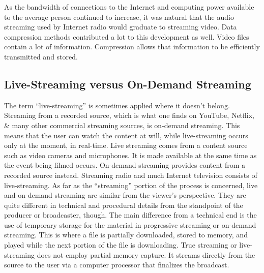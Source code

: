 \documentclass{article}
\begin{document}

As the bandwidth of connections to the Internet and computing power available to the average person continued to increase, it was natural that the audio streaming used by Internet radio would graduate to streaming video. Data compression methods contributed a lot to this development as well. Video files contain a lot of information. Compression allows that information to be efficiently transmitted and stored.

\subsection{Live-Streaming versus On-Demand Streaming}
The term “live-streaming” is sometimes applied where it doesn’t belong. Streaming from a recorded source, which is what one finds on YouTube, Netflix, \& many other commercial streaming sources, is on-demand streaming. This means that the user can watch the content at will, while live-streaming occurs only at the moment, in real-time. Live streaming comes from a content source such as video cameras and microphones. It is made available at the same time as the event being filmed occurs. On-demand streaming provides content from a recorded source instead. Streaming radio and much Internet television consists of live-streaming. As far as the “streaming” portion of the process is concerned, live and on-demand streaming are similar from the viewer’s perspective. They are quite different in technical and procedural details from the standpoint of the producer or broadcaster, though. The main difference from a technical end is the use of temporary storage for the material in progressive streaming or on-demand streaming. This is where a file is partially downloaded, stored to memory, and played while the next portion of the file is downloading. True streaming or live-streaming does not employ partial memory capture. It streams directly from the source to the user via a computer processor that finalizes the broadcast.
\end{document}
